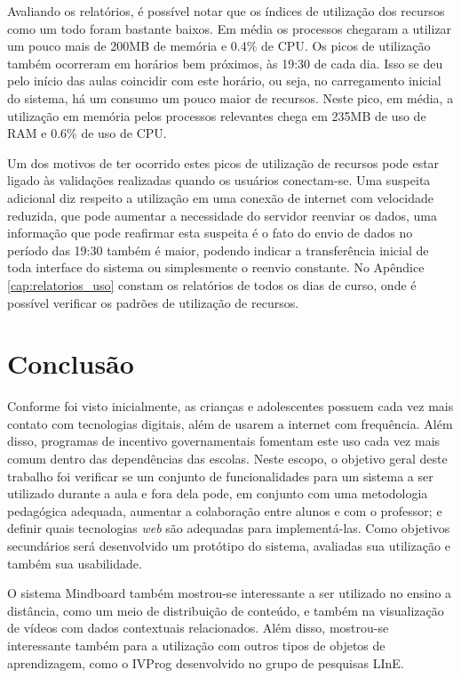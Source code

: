 Avaliando os relatórios, é possível notar que os índices de utilização dos recursos como um todo foram bastante baixos. Em média os processos chegaram a utilizar um pouco mais de 200MB de memória e 0.4\% de CPU. Os picos de utilização também ocorreram em horários bem próximos, às 19:30 de cada dia. Isso se deu pelo início das aulas coincidir com este horário, ou seja, no carregamento inicial do sistema, há um consumo um pouco maior de recursos. Neste pico, em média, a utilização em memória pelos processos relevantes chega em 235MB de uso de RAM e 0.6\% de uso de CPU.

Um dos motivos de ter ocorrido estes picos de utilização de recursos pode estar ligado às validações realizadas quando os usuários conectam-se. Uma suspeita adicional diz respeito a utilização em uma conexão de internet com velocidade reduzida, que pode aumentar a necessidade do servidor reenviar os dados, uma informação que pode reafirmar esta suspeita é o fato do envio de dados no período das 19:30 também é maior, podendo indicar a transferência inicial de toda interface do sistema ou simplesmente o reenvio constante. No Apêndice \ref{cap:relatorios_uso} constam os relatórios de todos os dias de curso, onde é possível verificar os padrões de utilização de recursos.

\chapter{Conclusão}
\label{cap:conclusao}

Conforme foi visto inicialmente, as crianças e adolescentes possuem cada vez mais contato com tecnologias digitais, além de usarem a internet com frequência. Além disso, programas de incentivo governamentais fomentam este uso cada vez mais comum dentro das dependências das escolas. Neste escopo, o objetivo geral deste trabalho foi verificar se um conjunto de funcionalidades para um sistema a ser utilizado durante a aula e fora dela pode, em conjunto com uma metodologia pedagógica adequada, aumentar a colaboração entre alunos e com o professor; e definir quais tecnologias \emph{web} são adequadas para implementá-las. Como objetivos secundários será desenvolvido um protótipo do sistema, avaliadas sua utilização e também sua usabilidade.

O sistema Mindboard também mostrou-se interessante a ser utilizado no ensino a distância, como um meio de distribuição de conteúdo, e também na visualização de vídeos com dados contextuais relacionados. Além disso, mostrou-se interessante também para a utilização com outros tipos de objetos de aprendizagem, como o IVProg desenvolvido no grupo de pesquisas LInE.

